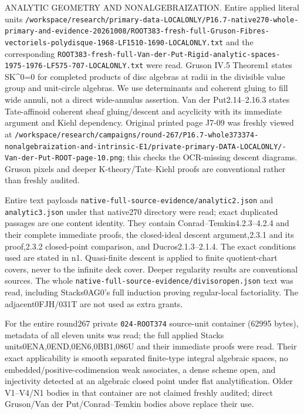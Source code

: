 \documentclass[11pt]{article}
\begin{document}
ANALYTIC GEOMETRY AND NONALGEBRAIZATION. Entire applied literal units \texttt{/\allowbreak workspace/\allowbreak research/\allowbreak primary-data-LOCALONLY/\allowbreak P16.7-native270-whole-primary-and-evidence-20261008/\allowbreak ROOT383-fresh-full-Gruson-Fibres-vectoriels-polydisque-1968-LF1510-1690-LOCALONLY.txt} and the corresponding \texttt{ROOT383-fresh-full-Van-der-Put-Rigid-analytic-spaces-1975-1976-LF575-707-LOCALONLY.txt} were read. Gruson IV.5 Theorem1 states SK\textasciicircum{}0=0 for completed products of disc algebras at radii in the divisible value group and unit-circle algebras. We use determinants and coherent gluing to fill wide annuli, not a direct wide-annulus assertion. Van der Put2.14--2.16.3 states Tate-affinoid coherent sheaf gluing/descent and acyclicity with its immediate argument and Kiehl dependency. Original printed page J7-09 was freshly viewed at \texttt{/\allowbreak workspace/\allowbreak research/\allowbreak campaigns/\allowbreak round-267/\allowbreak P16.7-whole373374-nonalgebraization-and-intrinsic-E1/\allowbreak private-primary-DATA-LOCALONLY/-Van-der-Put-ROOT-page-10.png}; this checks the OCR-missing descent diagrams. Gruson pixels and deeper K-theory/Tate--Kiehl proofs are conventional rather than freshly audited.

Entire text payloads \texttt{native-full-source-evidence/\allowbreak analytic2.json} and \texttt{analytic3.json} under that native270 directory were read; exact duplicated passages are one content identity. They contain Conrad--Temkin4.2.3--4.2.4 and their complete immediate proofs, the closed-ideal descent argument,2.3.1 and its proof,2.3.2 closed-point comparison, and Ducros2.1.3--2.1.4. The exact conditions used are stated in n1. Quasi-finite descent is applied to finite quotient-chart covers, never to the infinite deck cover. Deeper regularity results are conventional sources. The whole \texttt{native-full-source-evidence/\allowbreak divisoropen.json} text was read, including Stacks0AG0's full induction proving regular-local factoriality. The adjacent0FJH/031T are not used as extra grants.

For the entire round267 private \texttt{024-ROOT374} source-unit container (62995 bytes), metadata of all eleven units was read; the full applied Stacks units0ENA,0END,0EN6,0BB1,086U and their immediate proofs were read. Their exact applicability is smooth separated finite-type integral algebraic spaces, no embedded/positive-codimension weak associates, a dense scheme open, and injectivity detected at an algebraic closed point under flat analytification. Older V1--V4/N1 bodies in that container are not claimed freshly audited; direct Gruson/Van der Put/Conrad--Temkin bodies above replace their use.
\end{document}
